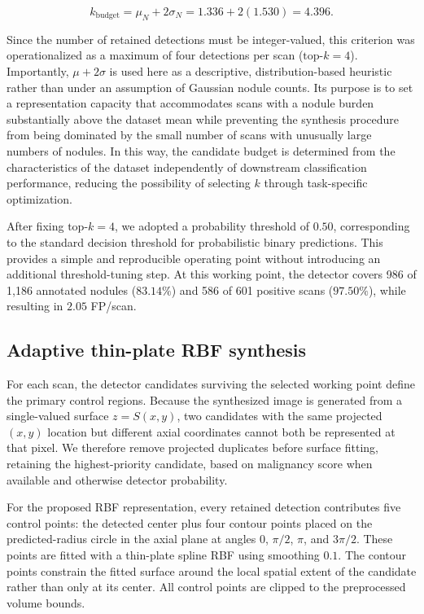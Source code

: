 \documentclass[preprint,12pt]{elsarticle}
\begin{document}
\begin{equation}
k_{\mathrm{budget}} = \mu_N + 2\sigma_N
= 1.336 + 2(1.530)
= 4.396.
\end{equation}

Since the number of retained detections must be integer-valued, this criterion was operationalized as a maximum of four detections per scan ($\mathrm{top}\text{-}k=4$). Importantly, $\mu+2\sigma$ is used here as a descriptive, distribution-based heuristic rather than under an assumption of Gaussian nodule counts. Its purpose is to set a representation capacity that accommodates scans with a nodule burden substantially above the dataset mean while preventing the synthesis procedure from being dominated by the small number of scans with unusually large numbers of nodules. In this way, the candidate budget is determined from the characteristics of the dataset independently of downstream classification performance, reducing the possibility of selecting $k$ through task-specific optimization.

After fixing $\mathrm{top}\text{-}k=4$, we adopted a probability threshold of $0.50$, corresponding to the standard decision threshold for probabilistic binary predictions. This provides a simple and reproducible operating point without introducing an additional threshold-tuning step. At this working point, the detector covers 986 of 1,186 annotated nodules ($83.14\%$) and 586 of 601 positive scans ($97.50\%$), while resulting in $2.05$ FP/scan.

\subsection{Adaptive thin-plate RBF synthesis}

For each scan, the detector candidates surviving the selected working point define the primary control regions. Because the synthesized image is generated from a single-valued surface $z=S(x,y)$, two candidates with the same projected $(x,y)$ location but different axial coordinates cannot both be represented at that pixel. We therefore remove projected duplicates before surface fitting, retaining the highest-priority candidate, based on malignancy score when available and otherwise detector probability.

For the proposed RBF representation, every retained detection contributes five control points: the detected center plus four contour points placed on the predicted-radius circle in the axial plane at angles $0$, $\pi/2$, $\pi$, and $3\pi/2$. These points are fitted with a thin-plate spline RBF using smoothing $0.1$. The contour points constrain the fitted surface around the local spatial extent of the candidate rather than only at its center. All control points are clipped to the preprocessed volume bounds.
\end{document}
